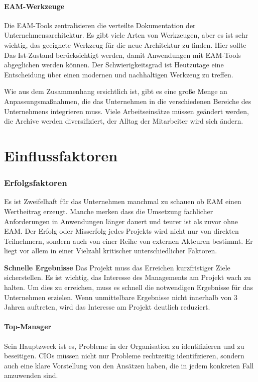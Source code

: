 \documentclass[doc]{apa6}
\begin{document}
\paragraph{EAM-Werkzeuge}
Die EAM-Tools zentralisieren die verteilte Dokumentation der Unternehmensarchitektur. Es gibt viele Arten von Werkzeugen, aber es ist sehr wichtig, das geeignete Werkzeug für die neue Architektur zu finden. Hier sollte Das Ist-Zustand berücksichtigt werden, damit Anwendungen mit EAM-Tools abgeglichen werden können. Der Schwierigkeitsgrad ist Heutzutage eine Entscheidung über einen modernen und nachhaltigen Werkzeug zu treffen.

Wie aus dem Zusammenhang ersichtlich ist, gibt es eine große Menge an Anpassungsmaßnahmen, die das Unternehmen in die verschiedenen Bereiche des Unternehmens integrieren muss. Viele Arbeitseinsätze müssen geändert werden, die Archive werden diversifiziert, der Alltag der Mitarbeiter wird sich ändern.

\section{Einflussfaktoren}
\subsubsection{Erfolgsfaktoren}
Es ist Zweifelhaft für das Unternehmen manchmal zu schauen ob EAM  einen Wertbeitrag erzeugt. Manche merken dass die Umsetzung fachlicher Anforderungen in Anwendungen länger dauert und teurer ist als zuvor ohne EAM.
Der Erfolg oder Misserfolg jedes Projekts wird nicht nur von direkten Teilnehmern, sondern auch von einer Reihe von externen Akteuren bestimmt. Er  liegt vor allem in einer Vielzahl kritischer unterschiedlicher Faktoren.

\textbf{Schnelle Ergebnisse} Das Projekt muss das Erreichen kurzfristiger Ziele sicherstellen. Es ist wichtig, das Interesse des Managements am Projekt wach zu halten. Um dies zu erreichen, muss es schnell die notwendigen Ergebnisse für das Unternehmen erzielen. Wenn unmittelbare Ergebnisse nicht innerhalb von 3 Jahren auftreten, wird das Interesse am Projekt deutlich reduziert.
\paragraph{Top-Manager} Sein Hauptzweck ist es, Probleme in der Organisation zu identifizieren und zu beseitigen. CIOs müssen nicht nur Probleme rechtzeitig identifizieren, sondern auch eine klare Vorstellung von den Ansätzen haben, die in jedem konkreten Fall anzuwenden sind.
\end{document}
